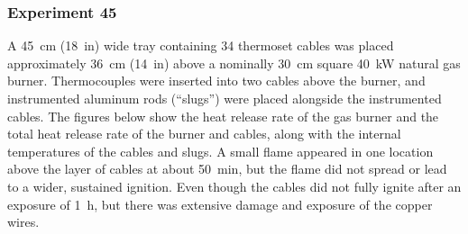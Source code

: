 \documentclass[12pt]{article}
\begin{document}
\subsubsection{Experiment 45}

A 45~cm (18~in) wide tray containing 34 thermoset cables was placed approximately 36~cm (14~in) above a nominally 30~cm square 40~kW natural gas burner. Thermocouples were inserted into two cables above the burner, and instrumented aluminum rods (``slugs'') were placed alongside the instrumented cables. The figures below show the heat release rate of the gas burner and the total heat release rate of the burner and cables, along with the internal temperatures of the cables and slugs. A small flame appeared in one location above the layer of cables at about 50~min, but the flame did not spread or lead to a wider, sustained ignition. Even though the cables did not fully ignite after an exposure of 1~h, but there was extensive damage and exposure of the copper wires.
\end{document}

